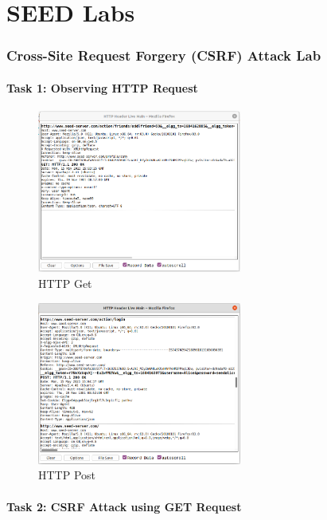 \documentclass[10pt,\jkfside,a4paper]{article}
\begin{document}
\part{SEED Labs}

\section{Cross-Site Request Forgery (CSRF) Attack Lab}

\subsection{Task 1: Observing HTTP Request}

\begin{figure}[H]
\centering
\includegraphics[width=0.6\textwidth]{httpget}
\caption{HTTP Get}
\end{figure}

\begin{figure}[H]
\centering
\includegraphics[width=0.6\textwidth]{httppost}
\caption{HTTP Post}
\end{figure}

\subsection{Task 2: CSRF Attack using GET Request}
\end{document}
